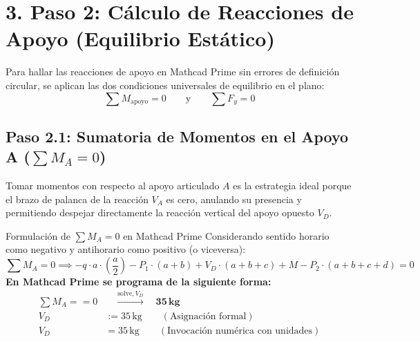 \documentclass[10pt,a4paper]{article}
\begin{document}
\vspace{6pt}

\section{\color{NavyBlue}3. Paso 2: Cálculo de Reacciones de Apoyo (Equilibrio Estático)}

Para hallar las reacciones de apoyo en Mathcad Prime sin errores de definición circular, se aplican las dos condiciones universales de equilibrio en el plano:
\[
\sum M_{\text{apoyo}} = 0 \qquad \text{y} \qquad \sum F_y = 0
\]

\subsection{Paso 2.1: Sumatoria de Momentos en el Apoyo A ($\sum M_A = 0$)}
Tomar momentos con respecto al apoyo articulado $A$ es la estrategia ideal porque el brazo de palanca de la reacción $V_A$ es cero, anulando su presencia y permitiendo despejar directamente la reacción vertical del apoyo opuesto $V_D$.

\begin{mathcadbox}{Formulación de $\sum M_A = 0$ en Mathcad Prime}
Considerando sentido horario como negativo y antihorario como positivo (o viceversa):
\begin{equation*}
    \sum M_A = 0 \implies - q \cdot a \cdot \left(\frac{a}{2}\right) - P_1 \cdot (a + b) + V_D \cdot (a + b + c) + M - P_2 \cdot (a + b + c + d) = 0
\end{equation*}
\textbf{En Mathcad Prime se programa de la siguiente forma:}
\begin{align*}
    \sum M_A == 0 & \quad \xrightarrow{\text{solve}, V_D} \quad \mathbf{35\,\text{kg}} \\
    V_D &:= 35\,\text{kg} \qquad (\text{Asignación formal}) \\
    V_D &= 35\,\text{kg} \qquad (\text{Invocación numérica con unidades})
\end{align*}
\end{mathcadbox}
\end{document}
